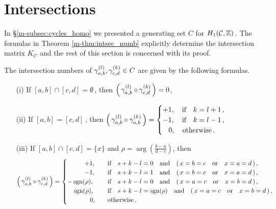 \documentclass[main.tex]{subfiles}
\begin{document}
  \section{Intersections}\label{sec:intersections}

  In \S \ref{m-subsec:cycles_homo} we presented a generating set $C$ for $H_1(\mathcal{C},\mathbb{Z})$\,. The formulas in Theorem \ref{m-thm:intsec_numb} explicitly determine the intersection matrix $K_C$ and
  the rest of this section is concerned with its proof.
  
  \begin{thm}\label{thm:intsec_numb}
      The intersection numbers of $\gamma_{a,b}^{(l)}, \gamma_{c,d}^{(k)} \in C$ are given by the following formulas.
      \begin{itemize}
       \item[(i)] If $[a,b] \cap [c,d] = \emptyset$\,, then $\left(\,\gamma_{a,b}^{(l)} \circ \gamma_{c,d}^{(k)}\,\right) = 0$, 
       \item[(ii)] If $[a,b] = [c,d]$\,, then $\left(\,\gamma_{a,b}^{(l)} \circ \gamma_{a,b}^{(k)}\,\right) = \begin{cases}
	 +1, \quad \text{if} \quad k = l+1\,, \\
	 -1, \quad \text{if} \quad k = l-1\,, \\
	  \quad\! 0, \quad \text{otherwise}\,.
	\end{cases}$
      \item[(iii)] If $[a,b] \cap [c,d] = \{x\}$ and $\rho = \arg\left(\frac{b-a}{d-c}\right)$, then
      \begin{align*}
       \left(\,\cyabl \circ \cycdk\,\right) = \begin{cases}
            \hspace*{0.95cm} +1, \quad & \text{if} \quad s+k-l=0 \quad \text{and} \quad (\,x = b = c \quad \text{or} \quad x = a = d\,)\,,\\
	     \hspace*{0.95cm} -1, \quad &\text{if} \quad s+k-l=1 \quad \text{and} \quad (\,x = b = c \quad \text{or} \quad x = a = d\,)\,,\\
           -\sgn(\rho), \quad & \text{if} \quad s+k-l=0 \quad \text{and} \quad (\,x = a = c \quad \text{or} \quad x = b = d\,)\,,\\
           \quad \sgn(\rho), \quad & \text{if} \quad s+k-l=\sgn(\rho) \quad \text{and} \quad (\,x = a = c \quad \text{or} \quad x = b = d\,)\,,\\
         \hspace*{0.95cm}  \quad\! 0, \quad &\text{otherwise}\,,
        \end{cases}

\end{align*}
\end{itemize}
\end{thm}
\end{document}
